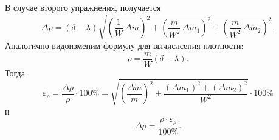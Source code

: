 \begin{Enumerate}
	В случае второго упражнения, получается
	\[
	\Delta\rho=(\delta-\lambda)\sqrt{\left(\frac{1}{W}\,\Delta m\right)^2+\left(\frac{m}{W^2}\,\Delta m_1\right)^2+\left(\frac{m}{W^2}\,\Delta m_2\right)^2}.
	\]
	Аналогично видоизменим формулу для вычислсения плотности:
	\[
	\rho=\frac{m}{W}(\delta-\lambda).
	\]
	Тогда
	\[
	\varepsilon_\rho=\frac{\Delta\rho}{\rho}\cdot100\%=\sqrt{\left(\frac{\Delta m}{m}\right)^2+\frac{(\Delta m_1)^2+(\Delta m_2)^2}{W^2}}\cdot100\% 
	\]
	и
	\[
	\Delta\rho=\frac{\rho\cdot\varepsilon_\rho}{100\%}.
	\]
\end{Enumerate}